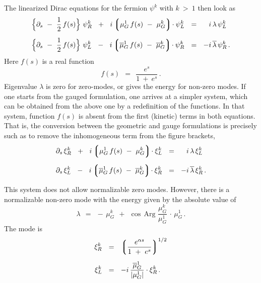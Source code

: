 \documentclass[epsfig,12pt]{article}
\def\beq{\begin{equation}}
\def\eeq{\end{equation}}
\def\beq{\begin{equation}}
\def\eeq{\end{equation}}
\newcommand{\p}{\partial}
\newcommand{\ov}{\overline}
\newcommand{\lgr}{\left\lgroup}
\newcommand{\rgr}{\right\rgroup}
\begin{document}
	The linearized Dirac equations for the fermion $ \psi^k $ with $ k ~>~ 1 $ then look as
\begin{align}
%
\notag
	\Big\{ \p_s  ~-~ \frac{1}{2}\, f(s) \Big\}\,\, \psi_R^k   ~~+~~  i \lgr  \mu_G^1\, f(s)  ~-~  \mu_G^k \rgr\! \cdot \psi_L^k  
	& ~~=~~ \phantom{-} i\, \lambda\, \psi_L^k   \\[2mm]
%
	\Big\{ \p_s  ~-~ \frac{1}{2}\, f(s) \Big\}\,\, \psi_L^k   ~~-~~  i \lgr \ov{\mu}{}_G^1\, f(s)  ~-~ \ov{\mu}{}_G^k \rgr\! \cdot \psi_R^k 
	& ~~=~~ - i\, \ov{\lambda}\, \psi_R^k \,.
\end{align}
	Here $ f(s) $ is a real function
\beq
	f(s) ~~=~~ \frac{     e^s     }
 	                { 1  ~+~  e^s }\,.
\eeq
	Eigenvalue $ \lambda $ is zero for zero-modes, or gives the energy for non-zero modes.
	If one starts from the gauged formulation, one arrives at a simpler system, which can be obtained from the
	above one by a redefinition of the functions.
	In that system, function $ f(s) $ is absent from the first (kinetic) terms in both equations.
	That is, the conversion between the geometric and gauge formulations is precisely such as to remove the inhomogeneous term from the
	figure brackets,
\begin{align}
%
\notag
	\p_s\, \xi_R^k  ~~+~~  i \lgr \mu_G^1\, f(s) ~-~ \mu_G^k \rgr\! \cdot \xi_L^k  & ~~=~~ \phantom{-} i\, \lambda\, \xi_L^k \\[2mm]
%
	\p_s\, \xi_L^k  ~~-~~  i \lgr \ov{\mu}{}_G^1\, f(s) ~-~ \ov{\mu}{}_G^k \rgr\! \cdot \xi_R^k & ~~=~~ - i\, \ov{\lambda}\, \xi_R^k \,.
\end{align}
       
	This system does not allow normalizable zero modes.
	However, there is a normalizable non-zero mode with the energy given by the absolute value of 
\beq
       \lambda  ~~=~~  -\, \mu_G^k  ~~+~~ \cos\, \text{Arg}\,\, \frac{\mu_G^k}{\mu_G^1}  \,\cdot\, \mu_G^1\,.
\eeq
	The mode is
\begin{align}
%
\notag
	\xi_R^k  & ~~=~~  \lgr \frac{  e^{\alpha s}  }
	                            {   1 ~+~ e^s    }  \rgr^{ 1/2 }  \\[2mm]
%
	\xi_L^k  & ~~=~~  - i\, \frac{ \ov{\mu}{}_G^1 }
	                             {  | \mu_G^1 |   } \cdot \xi_R^k\,.
\end{align}
	
\end{document}
